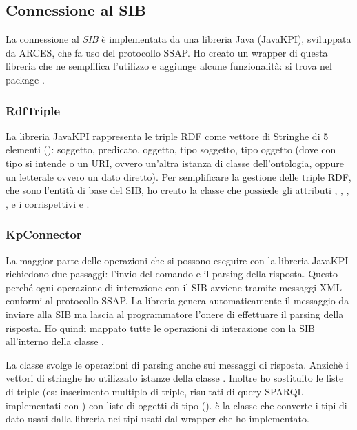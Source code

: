 \subsection{Connessione al SIB}

La connessione al \emph{SIB} è implementata da una libreria Java (JavaKPI), sviluppata da ARCES, che fa uso del protocollo SSAP. Ho creato un wrapper di questa libreria che ne semplifica l'utilizzo e aggiunge alcune funzionalità: si trova nel package .

\subsubsection{RdfTriple}

La libreria JavaKPI rappresenta le triple RDF come vettore di Stringhe di 5 elementi (): soggetto, predicato, oggetto, tipo soggetto, tipo oggetto (dove con tipo si intende o un URI, ovvero un'altra istanza di classe dell'ontologia, oppure un letterale ovvero un dato diretto). 
Per semplificare la gestione delle triple RDF, che sono l'entità di base del SIB, ho creato la classe  che possiede gli attributi , , , ,  e i corrispettivi  e .

\subsubsection{KpConnector}

La maggior parte delle operazioni che si possono eseguire con la libreria JavaKPI richiedono due passaggi: l'invio del comando e il parsing della risposta. Questo perché ogni operazione di interazione con il SIB avviene tramite messaggi XML conformi al protocollo SSAP. La libreria genera automaticamente il messaggio da inviare alla SIB ma lascia al programmatore l'onere di effettuare il parsing della risposta. Ho quindi mappato tutte le operazioni di interazione con la SIB all'interno della classe .

La classe  svolge le operazioni di parsing anche sui messaggi di risposta. Anzichè i vettori di stringhe ho utilizzato istanze della classe . Inoltre ho sostituito le liste di triple (es: inserimento multiplo di triple, risultati di query SPARQL implementati con ) con liste di oggetti di tipo  ().  è la classe che converte i tipi di dato usati dalla libreria  nei tipi usati dal wrapper che ho implementato.

